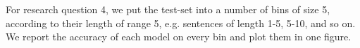 
For research question 4, we put the test-set into a number of bins of size 5,
according to their length of range 5, e.g. sentences of length 1-5, 5-10, and so
on. We report the accuracy of each model on every bin and plot them in one figure.

